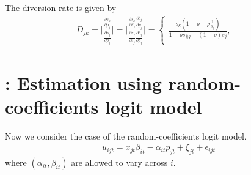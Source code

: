 \documentclass[11pt]{elegantbook}
\begin{document}
The diversion rate is given by
\begin{equation}
    \begin{aligned}
        D_{jk}=\bigg|\frac{\frac{\partial s_{k}}{\partial p_j}}{\frac{\partial s_{j}}{\partial p_j}}\bigg|=\bigg|\frac{\frac{\partial s_{k}}{\partial \delta_j}\frac{\partial \delta_j}{\partial p_j}}{\frac{\partial s_{j}}{\partial \delta_j}\frac{\partial \delta_{j}}{\partial p_j}}\bigg|=
        \left\{\begin{matrix}
            \frac{s_k\left(1-\rho+\rho\frac{1}{s_g}\right)}{1-\rho s_{j|g}-(1-\rho)s_j},&\\
            &
        \end{matrix}\right.
    \end{aligned}
    \nonumber
\end{equation}















\section{\cite{berry1995automobile}: Estimation using random-coefficients logit model}
Now we consider the case of the random-coefficients logit model.
\begin{equation}
    \begin{aligned}
        u_{ijt}=x_{jt}\beta_{it}-\alpha_{it}p_{jt}+\xi_{jt}+\epsilon_{ijt}
    \end{aligned}
    \nonumber
\end{equation}
where $(\alpha_{it},\beta_{it})$ are allowed to vary across $i$.
\end{document}
